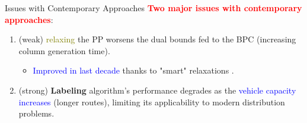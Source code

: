 \begin{frame}{Issues with Contemporary Approaches}
	\textcolor{red}{\textbf{Two major issues with contemporary approaches}}:
	\begin{enumerate}[<+->]
		\item (weak) \textcolor{olive}{relaxing} the PP worsens the dual bounds fed to the BPC (increasing column generation time).
		      \begin{itemize}[<.->]
			      \item \textcolor{blue}{Improved in last decade} thanks to "smart" relaxations \parencite{baldacci2011}.
		      \end{itemize}
		\item (strong) \textbf{Labeling} algorithm's performance degrades as the \textcolor{blue}{vehicle capacity increases} (longer routes), limiting its applicability to modern distribution problems.
	\end{enumerate}
\end{frame}

